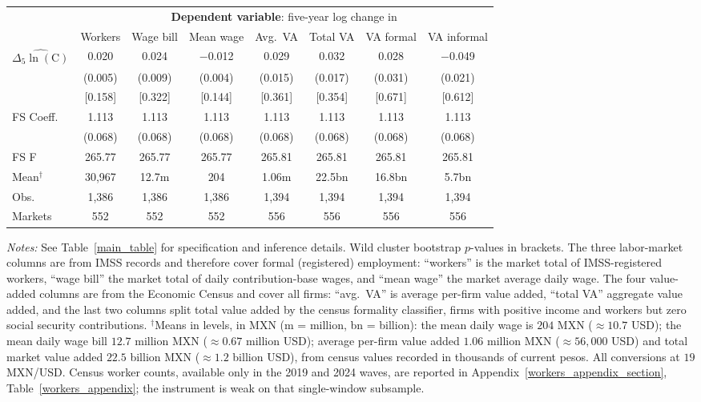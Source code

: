 \begin{threeparttable}
    \setlength{\tabcolsep}{3.5pt}
    \begin{tabular}{@{}l*{7}{c}@{}}
        \toprule
         & \multicolumn{7}{c}{\textbf{Dependent variable}: five-year log change in} \\
        \cmidrule(lr){2-8}
         & Workers & Wage bill & Mean wage & Avg.\ VA & Total VA & VA formal & VA informal \\
        \midrule
        $\widehat{\Delta_5\ln(\text{C})}$
        & 0.020\sym{***} & 0.024\sym{**} & $-$0.012\sym{***} & 0.029\sym{*} & 0.032\sym{*} & 0.028 & $-$0.049\sym{**} \\
        & (0.005) & (0.009) & (0.004) & (0.015) & (0.017) & (0.031) & (0.021) \\
        & [0.158] & [0.322] & [0.144] & [0.361] & [0.354] & [0.671] & [0.612] \\
        \midrule
        FS Coeff. & 1.113 & 1.113 & 1.113 & 1.113 & 1.113 & 1.113 & 1.113 \\
                  & (0.068) & (0.068) & (0.068) & (0.068) & (0.068) & (0.068) & (0.068) \\
        FS F & 265.77 & 265.77 & 265.77 & 265.81 & 265.81 & 265.81 & 265.81 \\
        Mean$^{\dagger}$ & 30{,}967 & 12.7m & 204 & 1.06m & 22.5bn & 16.8bn & 5.7bn \\
        Obs. & 1{,}386 & 1{,}386 & 1{,}386 & 1{,}394 & 1{,}394 & 1{,}394 & 1{,}394 \\
        Markets & 552 & 552 & 552 & 556 & 556 & 556 & 556 \\
        \bottomrule
    \end{tabular}
    \begin{tablenotes}[flushleft]
        \footnotesize
        \item \textit{Notes:} See Table~\ref{main_table} for specification and inference details. Wild cluster bootstrap $p$-values in brackets. The three labor-market columns are from IMSS records and therefore cover formal (registered) employment: ``workers'' is the market total of IMSS-registered workers, ``wage bill'' the market total of daily contribution-base wages, and ``mean wage'' the market average daily wage. The four value-added columns are from the Economic Census and cover all firms: ``avg.\ VA'' is average per-firm value added, ``total VA'' aggregate value added, and the last two columns split total value added by the census formality classifier, firms with positive income and workers but zero social security contributions. $^{\dagger}$Means in levels, in MXN (m = million, bn = billion): the mean daily wage is $204$ MXN ($\approx 10.7$ USD); the mean daily wage bill $12.7$ million MXN ($\approx 0.67$ million USD); average per-firm value added $1.06$ million MXN ($\approx 56{,}000$ USD) and total market value added $22.5$ billion MXN ($\approx 1.2$ billion USD), from census values recorded in thousands of current pesos. All conversions at $19$ MXN/USD. Census worker counts, available only in the 2019 and 2024 waves, are reported in Appendix~\ref{workers_appendix_section}, Table~\ref{workers_appendix}; the instrument is weak on that single-window subsample.

\end{tablenotes}
\end{threeparttable}
